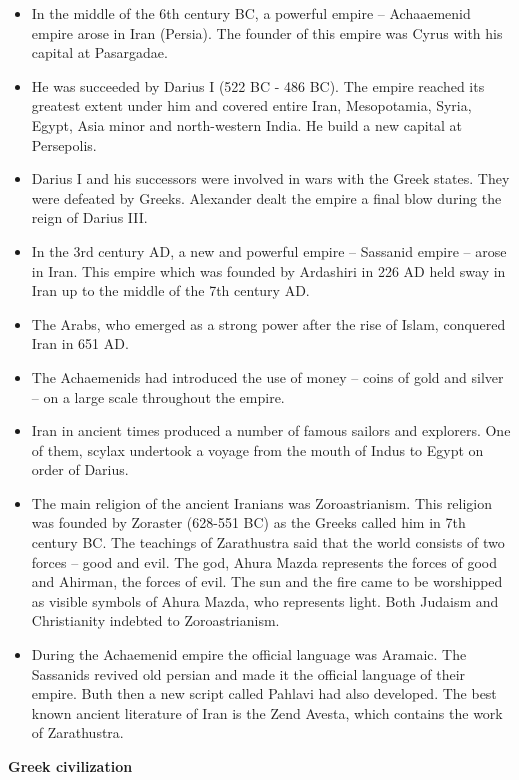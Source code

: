 \documentclass[
  openany]{book}
\providecommand{\tightlist}{%
  \setlength{\itemsep}{0pt}\setlength{\parskip}{0pt}}
\begin{document}
\begin{itemize}
\tightlist
\item
  In the middle of the 6th century BC, a powerful empire -- Achaaemenid empire arose in Iran (Persia). The founder of this empire was Cyrus with his capital at Pasargadae.
\item
  He was succeeded by Darius I (522 BC - 486 BC). The empire reached its greatest extent under him and covered entire Iran, Mesopotamia, Syria, Egypt, Asia minor and north-western India. He build a new capital at Persepolis.
\item
  Darius I and his successors were involved in wars with the Greek states. They were defeated by Greeks. Alexander dealt the empire a final blow during the reign of Darius III.
\item
  In the 3rd century AD, a new and powerful empire -- Sassanid empire -- arose in Iran. This empire which was founded by Ardashiri in 226 AD held sway in Iran up to the middle of the 7th century AD.
\item
  The Arabs, who emerged as a strong power after the rise of Islam, conquered Iran in 651 AD.
\item
  The Achaemenids had introduced the use of money -- coins of gold and silver -- on a large scale throughout the empire.
\item
  Iran in ancient times produced a number of famous sailors and explorers. One of them, scylax undertook a voyage from the mouth of Indus to Egypt on order of Darius.
\item
  The main religion of the ancient Iranians was Zoroastrianism. This religion was founded by Zoraster (628-551 BC) as the Greeks called him in 7th century BC. The teachings of Zarathustra said that the world consists of two forces -- good and evil. The god, Ahura Mazda represents the forces of good and Ahirman, the forces of evil. The sun and the fire came to be worshipped as visible symbols of Ahura Mazda, who represents light. Both Judaism and Christianity indebted to Zoroastrianism.
\item
  During the Achaemenid empire the official language was Aramaic. The Sassanids revived old persian and made it the official language of their empire. Buth then a new script called Pahlavi had also developed. The best known ancient literature of Iran is the Zend Avesta, which contains the work of Zarathustra.
\end{itemize}

\textbf{Greek civilization}
\end{document}
